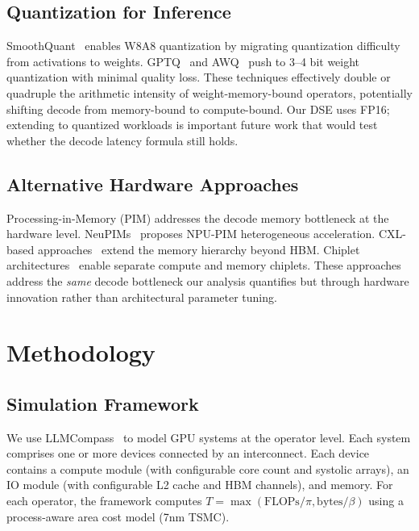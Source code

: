 \documentclass[sigconf,10pt]{acmart}
\begin{document}
\subsection{Quantization for Inference}

SmoothQuant~\cite{xiao2023smoothquant} enables W8A8 quantization by
migrating quantization difficulty from activations to weights.
GPTQ~\cite{frantar2023gptq} and AWQ~\cite{lin2024awq} push to 3--4 bit
weight quantization with minimal quality loss. These techniques
effectively double or quadruple the arithmetic intensity of
weight-memory-bound operators, potentially shifting decode from
memory-bound to compute-bound. Our DSE uses FP16; extending to
quantized workloads is important future work that would test whether
the decode latency formula still holds.

\subsection{Alternative Hardware Approaches}

Processing-in-Memory (PIM) addresses the decode memory bottleneck at
the hardware level. NeuPIMs~\cite{heo2024neupims} proposes NPU-PIM
heterogeneous acceleration. CXL-based approaches~\cite{gu2025pim,park2024cxlpnm,kim2025lia}
extend the memory hierarchy beyond HBM. Chiplet
architectures~\cite{shao2021simba,chipletgym2024} enable separate
compute and memory chiplets. These approaches address the \emph{same}
decode bottleneck our analysis quantifies but through hardware
innovation rather than architectural parameter tuning.

\section{Methodology}
\label{sec:methodology}

\subsection{Simulation Framework}

We use LLMCompass~\cite{llmcompass} to model GPU systems at the operator
level. Each system comprises one or more devices connected by an
interconnect. Each device contains a compute module (with configurable
core count and systolic arrays), an IO module (with configurable L2 cache
and HBM channels), and memory. For each operator, the framework computes
$T = \max(\text{FLOPs}/\pi, \text{bytes}/\beta)$ using a process-aware
area cost model (7nm TSMC).
\end{document}
